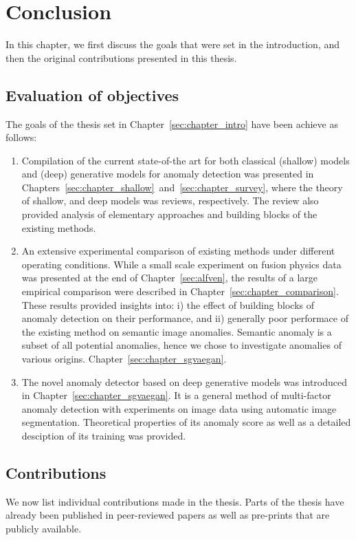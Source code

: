 \chapter{Conclusion} \label{sec:conclusion}
In this chapter, we first discuss the goals that were set in the introduction, and then the original contributions presented in this thesis.

\section{Evaluation of objectives}
The goals of the thesis set in Chapter~\ref{sec:chapter_intro} have been achieve as follows:

\begin{enumerate}
	\item Compilation of the current state-of-the art for both classical (shallow) models and (deep) generative models for anomaly detection was presented in Chapters~\ref{sec:chapter_shallow}~and~\ref{sec:chapter_survey}, where the theory of shallow, and deep models was reviews, respectively. The review also provided analysis of elementary approaches and building blocks of the existing methods.
	\item An extensive experimental comparison of existing methods under different operating conditions. While a small scale experiment on fusion physics data was presented at the end of Chapter~\ref{sec:alfven}, the results of a large empirical comparison were described in Chapter~\ref{sec:chapter_comparison}. These results provided insights into: i) the effect of building blocks of anomaly detection on their performance, and ii) generally poor performace of the existing method on semantic image anomalies. Semantic anomaly is a subset of all potential anomalies, hence we chose to investigate anomalies of various origins.  Chapter~\ref{sec:chapter_sgvaegan}.
	\item The novel anomaly detector based on deep generative models was introduced in Chapter~\ref{sec:chapter_sgvaegan}. It is a general method of multi-factor anomaly detection with experiments on image data using automatic image segmentation.  Theoretical properties of its anomaly score as well as a detailed desciption of its training was provided.
\end{enumerate}


\section{Contributions}
We now list individual contributions made in the thesis. Parts of the thesis have already been published in peer-reviewed papers as well as pre-prints that are publicly available.

